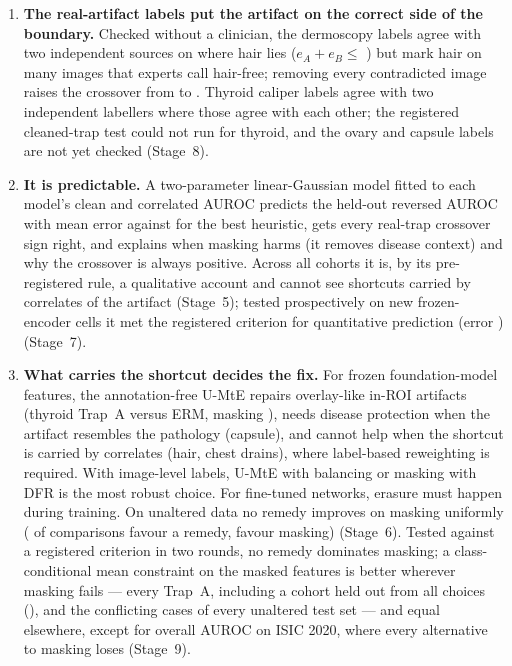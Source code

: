 \begin{enumerate}[leftmargin=*]
sensitivity loss at a fixed operating point was not found (Stage~7).
\item \textbf{The real-artifact labels put the artifact on the correct side of the boundary.} Checked without a
clinician, the dermoscopy labels agree with two independent sources on where hair lies ($e_A+e_B\le$ \sEightImaeSum) but
mark hair on many images that experts call hair-free; removing every contradicted image raises the crossover from
\sEightOrigisic{} to \sEightCleanisic. Thyroid caliper labels agree with two independent labellers where those agree with
each other; the registered cleaned-trap test could not run for thyroid, and the ovary and capsule labels are not yet
checked (Stage~8).
\item \textbf{It is predictable.} A two-parameter linear-Gaussian model fitted to each model's clean and correlated
AUROC predicts the held-out reversed AUROC with mean error \sFiveTMae{} against \sFiveTMaeSym{} for the best heuristic, gets
every real-trap crossover sign right, and explains when masking harms (it removes disease context) and why the crossover
is always positive. Across all cohorts it is, by its pre-registered rule, a qualitative account and cannot see shortcuts
carried by correlates of the artifact (Stage~5); tested prospectively on \sSevenTN{} new frozen-encoder cells it met the
registered criterion for quantitative prediction (error \sSevenTMae) (Stage~7).
\item \textbf{What carries the shortcut decides the fix.} For frozen foundation-model features, the annotation-free U-MtE
repairs overlay-like in-ROI artifacts (thyroid Trap~A \sSixRemThyroidmte{} versus ERM, masking \sSixRemThyroidmask), needs
disease protection when the artifact resembles the pathology (capsule), and cannot help when the shortcut is carried by
correlates (hair, chest drains), where label-based reweighting is required. With image-level labels, U-MtE with balancing
or masking with DFR is the most robust choice. For fine-tuned networks, erasure must happen during training. On unaltered
data no remedy improves on masking uniformly (\sSixNatRemPos{} of \sSixNatRemN{} comparisons favour a remedy,
\sSixNatRemNeg{} favour masking) (Stage~6). Tested against a registered criterion in two rounds, no remedy dominates
masking; a class-conditional mean constraint on the masked features is better wherever masking fails --- every Trap~A,
including a cohort held out from all choices (\sNineCmcDTwoTrapovary), and the conflicting cases of every unaltered test
set --- and equal elsewhere, except for \sNineCmcDOneallisicTwoZeroTwoZero{} overall AUROC on ISIC 2020, where every
alternative to masking loses (Stage~9).
\end{enumerate}

